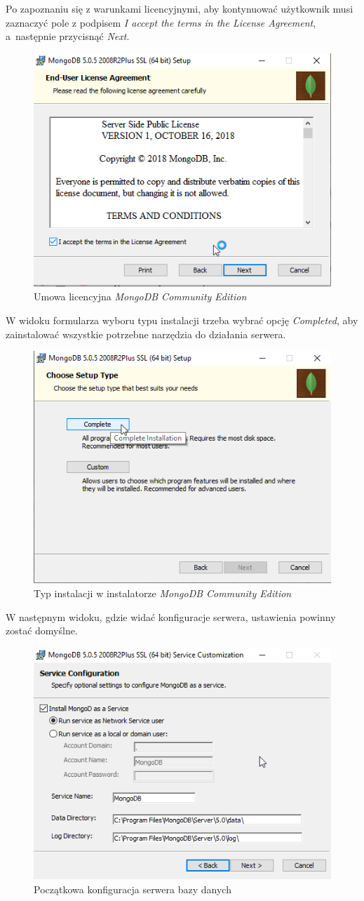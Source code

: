 \documentclass[a4paper,twoside,12pt]{book}
\begin{document}
\newpage
Po zapoznaniu się z warunkami licencyjnymi, aby kontynuować użytkownik musi zaznaczyć pole z podpisem \textit{I accept the terms in the License Agreement}, a~następnie przycisnąć \textit{Next}.
\begin{figure}[h!]
	\centering
	\includegraphics[width=0.65\linewidth]{../zrzuty_ekranu/instalcja_mongodb/mongodb2}
	\caption{Umowa licencyjna \textit{MongoDB Community Edition}}
	\label{fig:mongodb2}
\end{figure}
\FloatBarrier

W widoku formularza wyboru typu instalacji trzeba wybrać opcję \textit{Completed}, aby zainstalować wszystkie potrzebne narzędzia do działania serwera.
\begin{figure}[h!]
	\centering
	\includegraphics[width=0.6\linewidth]{../zrzuty_ekranu/instalcja_mongodb/mongodb3}
	\caption{Typ instalacji w instalatorze \textit{MongoDB Community Edition}}
	\label{fig:mongodb3}
\end{figure}
\FloatBarrier

W następnym widoku, gdzie widać konfiguracje serwera, ustawienia powinny zostać domyślne.
\begin{figure}[h!]
	\centering
	\includegraphics[width=0.6\linewidth]{../zrzuty_ekranu/instalcja_mongodb/mongodb4}
	\caption{Początkowa konfiguracja serwera bazy danych}
	\label{fig:mongodb4}
\end{figure}
\FloatBarrier
\end{document}
